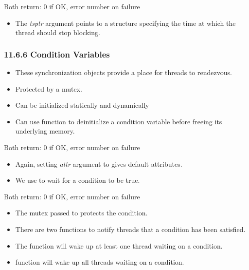 \documentclass[]{article}
\begin{document}
Both return: 0 if OK, error number on failure

\begin{itemize}
\item The \emph{tsptr} argument points to a  structure specifying
the time at which the thread should stop blocking.
\end{itemize}

\subsubsection*{11.6.6 Condition Variables}
\begin{itemize}
\item These synchronization objects provide a place for threads to rendezvous.
\item Protected by a mutex.
\item Can be initialized statically and dynamically
\item Can use  function to deinitialize a condition
variable before freeing its underlying memory.
\end{itemize}




Both return: 0 if OK, error number on failure

\begin{itemize}
\item Again, setting \emph{attr} argument to  gives default
attributes.
\item We use  to wait for a condition to be true.
\end{itemize}




Both return: 0 if OK, error number on failure

\begin{itemize}
\item The mutex passed to  protects the condition.
\item There are two functions to notify threads that a condition has been
satisfied.
\item The  function will wake up at least one thread
waiting on a condition.
\item {} function will wake up all threads waiting
on a condition.
\end{itemize}
\end{document}
